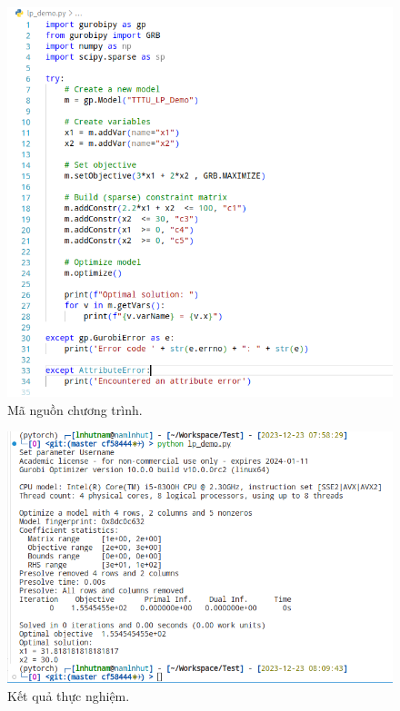 \begin{figure}[h!]
    \includegraphics[width=0.85\linewidth]{figures/lp_demo1.png}
    \caption{Mã nguồn chương trình.}
    \label{fig:lp_demo1}
\end{figure}

\begin{figure}[h!]
    \includegraphics[width=0.85\linewidth]{figures/lp_demo2.png}
    \caption{Kết quả thực nghiệm.}
    \label{fig:lp_demo2}
\end{figure}